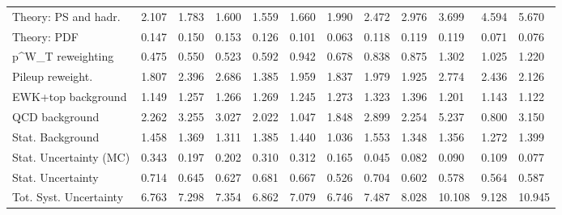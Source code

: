 \begin{tabular}{l|p{0.6cm}p{0.6cm}p{0.6cm}p{0.6cm}p{0.6cm}p{0.6cm}p{0.6cm}p{0.6cm}p{0.6cm}p{0.6cm}p{0.6cm}}
Theory: PS and hadr.                     & 2.107 & 1.783 & 1.600 & 1.559 & 1.660 & 1.990 & 2.472 & 2.976 & 3.699 & 4.594 & 5.670 \\
Theory: PDF                              & 0.147 & 0.150 & 0.153 & 0.126 & 0.101 & 0.063 & 0.118 & 0.119 & 0.119 & 0.071 & 0.076 \\
p^{W}_{T} reweighting                    & 0.475 & 0.550 & 0.523 & 0.592 & 0.942 & 0.678 & 0.838 & 0.875 & 1.302 & 1.025 & 1.220 \\
Pileup reweight.                         & 1.807 & 2.396 & 2.686 & 1.385 & 1.959 & 1.837 & 1.979 & 1.925 & 2.774 & 2.436 & 2.126 \\
EWK+top background                       & 1.149 & 1.257 & 1.266 & 1.269 & 1.245 & 1.273 & 1.323 & 1.396 & 1.201 & 1.143 & 1.122 \\
QCD background                           & 2.262 & 3.255 & 3.027 & 2.022 & 1.047 & 1.848 & 2.899 & 2.254 & 5.237 & 0.800 & 3.150 \\
Stat. Background                         & 1.458 & 1.369 & 1.311 & 1.385 & 1.440 & 1.036 & 1.553 & 1.348 & 1.356 & 1.272 & 1.399 \\
Stat. Uncertainty (MC)                   & 0.343 & 0.197 & 0.202 & 0.310 & 0.312 & 0.165 & 0.045 & 0.082 & 0.090 & 0.109 & 0.077 \\
\hline
Stat. Uncertainty                        & 0.714 & 0.645 & 0.627 & 0.681 & 0.667 & 0.526 & 0.704 & 0.602 & 0.578 & 0.564 & 0.587 \\
\hline
Tot. Syst. Uncertainty                   & 6.763 & 7.298 & 7.354 & 6.862 & 7.079 & 6.746 & 7.487 & 8.028 & 10.108 & 9.128 & 10.945 \\
\hline
\end{tabular}
